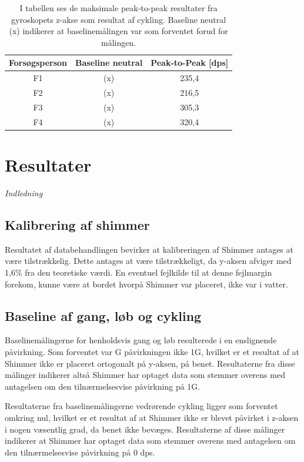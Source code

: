 \begin{table}[H]
	\centering
	\begin{tabular}{ccc}
		\hline
		\rowcolor[HTML]{C0C0C0} 
		Forsøgsperson & Baseline neutral & Peak-to-Peak {[}dps{]} \\ \hline
		F1 & (x) & 235,4 \\ \hline
		F2 & (x) & 216,5 \\ \hline
		F3 & (x) & 305,3 \\ \hline
		F4 & (x) & 320,4 \\ \hline
	\end{tabular}
	\caption{I tabellen ses de maksimale peak-to-peak resultater fra gyroskopets z-akse som resultat af cykling. Baseline neutral (x) indikerer at baselinemålingen var som forventet forud for målingen.}
	\label{app:cyklingmaxdps}
\end{table}


\section{Resultater}
\textit{Indledning}
\subsection{Kalibrering af shimmer}
Resultatet af databehandlingen bevirker at kalibreringen af Shimmer antages at være tilstrækkelig. Dette antages at være tilstrækkeligt, da y-aksen  afviger med 1,6\% fra den teoretiske værdi. En eventuel fejlkilde til at denne fejlmargin forekom, kunne være at bordet hvorpå Shimmer var placeret, ikke var i vatter.

\subsection{Baseline af gang, løb og cykling}
Baselinemålingerne for henholdsvis gang og løb resulterede i en enslignende påvirkning. Som forventet var G påvirkningen ikke 1G, hvilket er et resultat af at Shimmer ikke er placeret ortogonalt på y-aksen, på benet. Resultaterne fra disse målinger indikerer altså Shimmer har optaget data som stemmer overens med antagelsen om den tilnærmelsesvise påvirkning på 1G. 

Resultaterne fra baselinemålingerne vedrørende cykling ligger som forventet omkring nul, hvilket er et resultat af at Shimmer ikke er blevet påvirket i z-aksen i nogen væsentlig grad, da benet ikke bevæges. Resultaterne af disse målinger indikerer at Shimmer har optaget data som stemmer overens med antagelsen om den tilnærmelsesvise påvirkning på 0 dps. 

